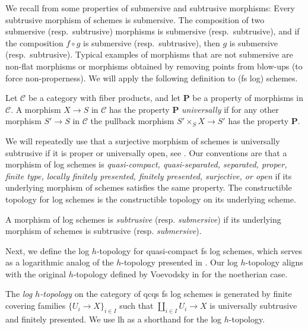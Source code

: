 \documentclass[10pt]{amsart}
\newcommand{\cC}{\mathcal{C}}
\begin{document}
We recall from \cite[pp.\ 187, 190]{Rydh} some properties of submersive and subtrusive morphisms:
Every subtrusive morphism of schemes is submersive.
The composition of two submersive (resp.\ subtrusive) morphisms is submersive (resp.\ subtrusive), and if the composition $f \circ g$ is submersive (resp.\ subtrusive), 
then $g$ is submersive (resp.\ subtrusive).
Typical examples of morphisms that are not submersive are non-flat morphisms or morphisms obtained by removing points from blow-ups (to force non-properness).
We will apply the following definition to (fs log) schemes.

\begin{definition}
Let $\cC$ be a category with fiber products,
and let $\mathbf{P}$ be a property of morphisms in $\cC$.
A morphism $X \to S$ in $\cC$ has the property $\mathbf{P}$ \emph{universally} if for any other morphism 
$S' \to S$ in $\cC$ the pullback morphism $S' \times_S X \to S'$ has the property $\mathbf{P}.$
\end{definition}

We will repeatedly use that a surjective morphism of schemes is universally subtrusive 
if it is proper or universally open, see \cite[Remark 2.5]{Rydh}.
Our conventions are that 
a morphism of log schemes is \emph{quasi-compact, quasi-separated, separated, proper, 
finite type, locally finitely presented, 
finitely presented, surjective, or open} if its underlying morphism of schemes 
satisfies the same property.
The constructible topology for log schemes is the constructible topology on its 
underlying scheme.

\begin{definition}
A morphism of log schemes is
\emph{subtrusive} (resp. \emph{submersive}) 
if its underlying morphism of schemes 
is subtrusive (resp. \emph{submersive}).
\end{definition}

Next, we define the log $h$-topology for quasi-compact fs log schemes, which serves as a logarithmic analog of the $h$-topology presented in \cite[Definition 8.1]{Rydh}. Our log $h$-topology aligns with the original $h$-topology defined by Voevodsky in \cite[Definition 3.1.2]{Voevodsky-Homology} for the noetherian case.


\begin{definition}
\label{definition:loghtop}
The \emph{log $h$-topology} on the category of qcqs fs log schemes is generated by finite covering 
families $\{U_i\to X\}_{i\in I}$ such that $\amalg_{i\in I} U_i\to X$ is universally subtrusive and 
finitely presented.
We use lh as a shorthand for the log $h$-topology.
\end{definition}
\end{document}
